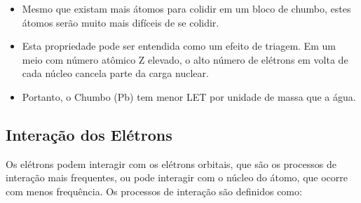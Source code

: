 \documentclass[11pt,a4paper]{article}
\begin{document}
\begin{itemize}
			\begin{itemize}
				\item Mesmo que existam mais átomos para colidir em um bloco de chumbo, estes átomos serão muito mais difíceis de se colidir. 
					
				\item Esta propriedade pode ser entendida como um efeito de triagem. Em um meio com número atômico Z elevado, o alto número de elétrons em volta de cada núcleo cancela parte da carga nuclear. 
					
				\item Portanto, o Chumbo (Pb) tem menor LET por unidade de massa que a água. 
			\end{itemize}
	\end{itemize}        

\subsection*{Interação dos Elétrons}

    Os elétrons podem interagir com os elétrons orbitais, que são os processos de interação mais frequentes, ou pode interagir com o núcleo do átomo, que ocorre com menos frequência. Os processos de interação são definidos como:
\end{document}
